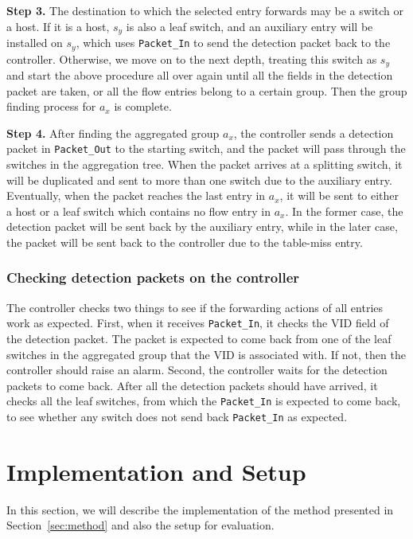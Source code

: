 \documentclass[conference]{IEEEtran}
\begin{document}
\textbf{Step 3.}
The destination to which the selected entry forwards may be a switch or a host. If it is a host, $s_y$ is also a leaf switch, and an auxiliary entry will be installed on $s_y$, which uses \texttt{Packet\_In} to send the detection packet back to the controller. Otherwise, we move on to the next depth, treating this switch as $s_y$ and start the above procedure all over again until all the fields in the detection packet are taken, or all the flow entries belong to a certain group. Then the group finding process for $a_x$ is complete.

\textbf{Step 4.}
After finding the aggregated group $a_x$, the controller sends a detection packet in \texttt{Packet\_Out} to the starting switch, and the packet will pass through the switches in the aggregation tree. When the packet arrives at a splitting switch, it will be duplicated and sent to more than one switch due to the auxiliary entry. Eventually, when the packet reaches the last entry in $a_x$, it will be sent to either a host or a leaf switch which contains no flow entry in $a_x$. In the former case, the detection packet will be sent back by the auxiliary entry, while in the later case, the packet will be sent back to the controller due to the table-miss entry.

\subsubsection{Checking detection packets on the controller}
The controller checks two things to see if the forwarding actions of all entries work as expected. First, when it receives \texttt{Packet\_In}, it checks the VID field of the detection packet. The packet is expected to come back from one of the leaf switches in the aggregated group that the VID is associated with. If not, then the controller should raise an alarm. Second, the controller waits for the detection packets to come back. After all the detection packets should have arrived, it checks all the leaf switches, from which the \texttt{Packet\_In} is expected to come back, to see whether any switch does not send back \texttt{Packet\_In} as expected. 

\section{Implementation and Setup}
\label{Implementation_and_Evaluation}
In this section, we will describe the implementation of the method presented in Section~\ref{sec:method} and also the setup for evaluation.
\end{document}
